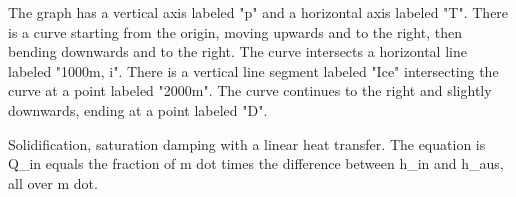 The graph has a vertical axis labeled "p" and a horizontal axis labeled "T". There is a curve starting from the origin, moving upwards and to the right, then bending downwards and to the right. The curve intersects a horizontal line labeled "1000m, i". There is a vertical line segment labeled "Ice" intersecting the curve at a point labeled "2000m". The curve continues to the right and slightly downwards, ending at a point labeled "D".

Solidification, saturation damping with a linear heat transfer. The equation is Q_in equals the fraction of m dot times the difference between h_in and h_aus, all over m dot.